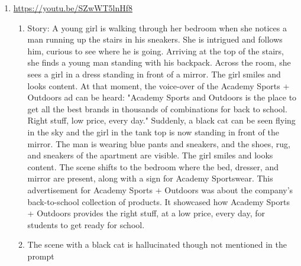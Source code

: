 \documentclass[hidelinks,11pt,a4paper]{report}
\begin{document}
\begin{enumerate}
    \item \url{https://youtu.be/SZwWT5lnHf8} 
    \begin{enumerate}
        \item Story: A young girl is walking through her bedroom when she notices a man running up the stairs in his sneakers. She is intrigued and follows him, curious to see where he is going. Arriving at the top of the stairs, she finds a young man standing with his backpack. Across the room, she sees a girl in a dress standing in front of a mirror. The girl smiles and looks content. At that moment, the voice-over of the Academy Sports + Outdoors ad can be heard: "Academy Sports and Outdoors is the place to get all the best brands in thousands of combinations for back to school. Right stuff, low price, every day." Suddenly, a black cat can be seen flying in the sky and the girl in the tank top is now standing in front of the mirror. The man is wearing blue pants and sneakers, and the shoes, rug, and sneakers of the apartment are visible. The girl smiles and looks content. The scene shifts to the bedroom where the bed, dresser, and mirror are present, along with a sign for Academy Sportswear. This advertisement for Academy Sports + Outdoors was about the company's back-to-school collection of products. It showcased how Academy Sports + Outdoors provides the right stuff, at a low price, every day, for students to get ready for school.

        \item The scene with a black cat is hallucinated though not mentioned in the prompt

    \end{enumerate}
    

\end{enumerate}
\end{document}
